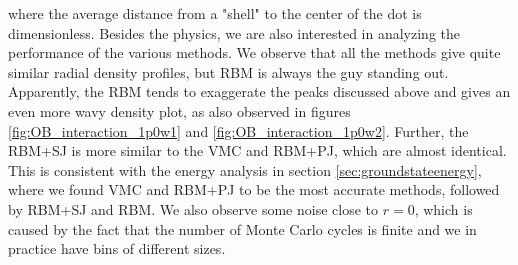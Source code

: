 \noindent
where the average distance from a "shell" to the center of the dot is dimensionless. Besides the physics, we are also interested in analyzing the performance of the various methods. We observe that all the methods give quite similar radial density profiles, but RBM is always the guy standing out. Apparently, the RBM tends to exaggerate the peaks discussed above and gives an even more wavy density plot, as also observed in figures \eqref{fig:OB_interaction_1p0w1} and \eqref{fig:OB_interaction_1p0w2}. Further, the RBM+SJ is more similar to the VMC and RBM+PJ, which are almost identical. This is consistent with the energy analysis in section \ref{sec:groundstateenergy}, where we found VMC and RBM+PJ to be the most accurate methods, followed by RBM+SJ and RBM. We also observe some noise close to $r=0$, which is caused by the fact that the number of Monte Carlo cycles is finite and we in practice have bins of different sizes.

